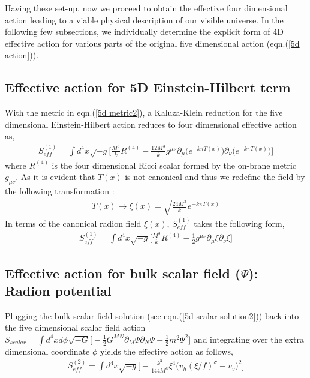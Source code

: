 \documentclass[a4paper]{article}
\begin{document}
Having these set-up, now we proceed to obtain the effective four dimensional action leading to a viable physical 
description of our visible universe. In the following few subsections, we individually determine the explicit form of 4D effective action 
for various parts of the original five dimensional action (eqn.(\ref{5d action})).

\subsection{Effective action for 5D Einstein-Hilbert term}
With the metric in eqn.(\ref{5d metric2}), a Kaluza-Klein reduction for the five dimensional Einstein-Hilbert action reduces 
to four dimensional effective action as,
\begin{eqnarray}
 S_{eff}^{(1)} = \int d^4x \sqrt{-g}\bigg[\frac{M^3}{k}R^{(4)} 
 - \frac{12M^3}{k}g^{\mu\nu}\partial_{\mu}\bigg(e^{-k\pi T(x)}\bigg)\partial_{\nu}\bigg(e^{-k\pi T(x)}\bigg)\bigg]
 \label{effective action non canonical}
\end{eqnarray}
where $R^{(4)}$ is the four dimensional Ricci scalar formed by the on-brane metric $g_{\mu\nu}$. As it is evident that $T(x)$ is not canonical 
and thus we redefine the field by the following transformation :
\begin{eqnarray}
 T(x) \longrightarrow \xi(x) = \sqrt{\frac{24M^3}{k}}e^{-k\pi T(x)}
 \label{transformation}
\end{eqnarray}
In terms of the canonical radion field $\xi(x)$, $S_{eff}^{(1)}$ takes the following form,
\begin{eqnarray}
 S_{eff}^{(1)} = \int d^4x \sqrt{-g}\bigg[\frac{M^3}{k}R^{(4)} 
 - \frac{1}{2}g^{\mu\nu}\partial_{\mu}\xi\partial_{\nu}\xi\bigg]
 \label{effective action1}
\end{eqnarray}

\subsection{Effective action for bulk scalar field ($\Psi$): Radion potential}
Plugging the bulk scalar field solution (see eqn.(\ref{5d scalar solution2})) back into the five dimensional scalar field action 
$S_{scalar} = \int d^4xd\phi\sqrt{-G}\big[-\frac{1}{2}G^{MN}\partial_{M}\Psi\partial_N\Psi-\frac{1}{2}m^2\Psi^2\big]$ and integrating 
over the extra dimensional coordinate $\phi$ yields the effective action as follows,
\begin{eqnarray}
 S_{eff}^{(2)} = \int d^4x\sqrt{-g}\bigg[-\frac{k^3}{144M^6}\xi^4\bigg(v_h(\xi/f)^{\sigma} - v_v\bigg)^2\bigg]
 \label{effective action2}
\end{eqnarray}
\end{document}
